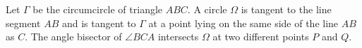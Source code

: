 Let $\Gamma$ be the circumcircle of triangle $ABC$. A circle $\Omega$ is tangent to the line segment $AB$ and is tangent to $\Gamma$ at a point lying on the same side of the line $AB$ as $C$. The angle bisector of $\angle{BCA}$ intersects $\Omega$ at two different points $P$ and $Q$.